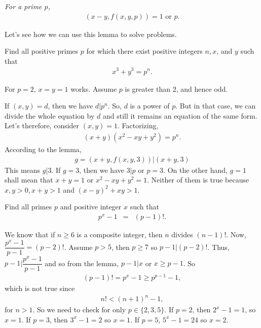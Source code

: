 \documentclass[main.tex]{subfile}
\begin{document}
	\begin{corollary}\slshape
		For a prime $p$,
		\begin{align*}
			(x-y,f(x,y,p))=1 \text{ or } p.
		\end{align*}
	\end{corollary}

Let's see how we can use this lemma to solve problems.

	\begin{problem}[Hungary 2000]
		Find all positive primes $p$ for which there exist positive
		integers $n,x$, and $y$ such that
		\begin{align*}
			x^3+y^3=p^n.
		\end{align*}
	\end{problem}

	\begin{solution}
		For $p=2$, $x=y=1$ works. Assume $p$ is greater than $2$, and hence odd.

		If $(x, y)=d$, then we have $d|p^n$. So, $d$ is a power of $p$. But in that case, we can divide the whole equation by $d$ and still it remains an equation of the same form. Let's therefore, consider $(x, y)=1$. Factorizing,
		\begin{align*}
			(x+y)(x^2-xy+y^2)=p^n.
		\end{align*}
		According to the lemma,
		\begin{align*}
			g=\left(x+y, f(x, y, 3)\right)\big|(x+y,3)
		\end{align*}
		This means $g|3$. If $g=3$, then we have $3|p$ or $p=3$. On the other hand, $g=1$ shall mean that $x+y=1$ or $x^2-xy+y^2=1$. Neither of them is true because $x,y>0,x+y>1$ and $(x-y)^2+xy>1$.
	\end{solution}

	\begin{problem}
		Find all primes $p$ and positive integer $x$ such that
			\begin{eqnarray*}
				p^x-1 & = & (p-1)!.
			\end{eqnarray*}
	\end{problem}

	\begin{solution}
		We know that if $n\geq 6$ is a composite integer, then $n$ divides $(n-1)!$. Now, $\dfrac{p^x-1}{p-1}=(p-2)!$. Assume $p>5$, then $p\geq7$ so $p-1|(p-2)!$. Thus, $p-1 \big| \dfrac{p^x-1}{p-1}$ and so from the lemma, $p-1|x$ or $x\geq p-1$. So
			\begin{align*}
				(p-1)!  =  p^x-1\geq p^{p-1}-1,
			\end{align*}
		which is not true since
			\begin{align*}
				n!  < (n+1)^n-1,
			\end{align*}
		for $n>1$. So we need to check for only $p\in\{2,3,5\}$. If $p=2$, then $2^x-1=1$, so $x=1$. If $p=3$, then $3^x-1=2$ so $x=1$. If $p=5$, $5^x-1=24$ so $x=2$.
	\end{solution}
\end{document}
